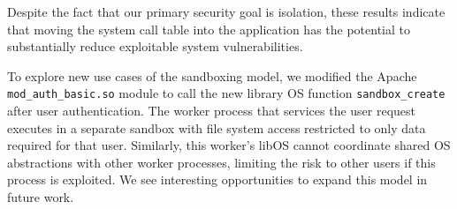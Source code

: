  
\begin{comment}
As Table \ref{table:vulnerabilities} illustrates almost all Linux
system call-related vulnerabilities are prevented through the \sysname{}
paradigm. These vulnerabilities are related to system calls or flags
that are blocked or restricted in \sysname{}, such as I/O control, event
polling and notification, huge pages, socket options, task stats,
\emph{etc.}  \sysname{} also restricts rarely used network protocols
such as VSOCK, TIPC and ROSE, and this prevents 41\% of network
vulnerabilities in \sysname{} systems. The Manifest file used to
restrict portions of the file system also prevented 2 FS-related
vulnerabilities. We also considered vulnerabilities in Linux
applications as preventable by \sysname{}, as all the effects are
confined in the correspondent \picoproc{} or sandbox. 
\end{comment}



Despite the fact that our primary security goal is isolation, 
these results indicate that moving the system call table into 
the application has the potential to substantially reduce exploitable 
system vulnerabilities.

\vspace{5pt}
To explore new use cases of the \sysname{} sandboxing model, we modified the 
Apache {\tt mod\_\-auth\_\-basic.so} module to call the new library OS function
{\tt sandbox\_create} after user authentication.
The work\-er process that services the user request executes in a separate sandbox 
with file system access restricted to only data required for that user.
Similarly, this worker's libOS cannot coordinate shared OS abstractions with other worker processes,
limiting the risk to other users if this process is exploited.
We see interesting opportunities to expand this model in future work.






